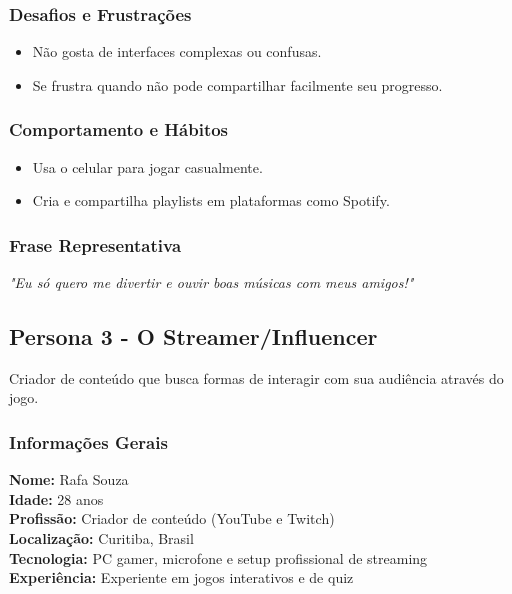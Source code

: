 \begin{titlepage}
    \subsubsection{Desafios e Frustrações}
        \begin{itemize}
            \item Não gosta de interfaces complexas ou confusas.
            \item Se frustra quando não pode compartilhar facilmente seu progresso.
        \end{itemize}

    \subsubsection{Comportamento e Hábitos}
        \begin{itemize}
            \item Usa o celular para jogar casualmente.
            \item Cria e compartilha playlists em plataformas como Spotify.
        \end{itemize}
    
    \subsubsection{Frase Representativa}
        \textit{"Eu só quero me divertir e ouvir boas músicas com meus amigos!"}

    \subsection{Persona 3 - O Streamer/Influencer}
    Criador de conteúdo que busca formas de interagir com sua audiência através do jogo.

    \subsubsection{Informações Gerais}
        \textbf{Nome:} Rafa Souza\\
        \textbf{Idade:} 28 anos\\
        \textbf{Profissão:} Criador de conteúdo (YouTube e Twitch)\\
        \textbf{Localização:} Curitiba, Brasil\\
        \textbf{Tecnologia:} PC gamer, microfone e setup profissional de streaming\\
        \textbf{Experiência:} Experiente em jogos interativos e de quiz\\


\end{titlepage}
